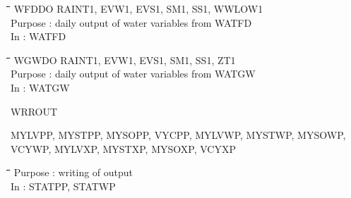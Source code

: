 \documentclass[11pt]{article}
\begin{document}
\begin{tabbing}
\hspace{1.27cm}\=\hspace{1.27cm}\=\hspace{1.27cm}\=\hspace{1.27cm}\=%
\hspace{1.27cm}\=\hspace{1.27cm}\=\hspace{1.27cm}\=\hspace{1.27cm}\=%
\hspace{1.27cm}\=\hspace{1.27cm}\=\kill
 WFDDO\> \> RAINT1, EVW1, EVS1, SM1, SS1, WWLOW1\\
\>\> Purpose\> : daily output of water variables from WATFD\\
\>\> In\> : WATFD
\end{tabbing}

\nwln
\begin{tabbing}
\hspace{1.27cm}\=\hspace{1.27cm}\=\hspace{1.27cm}\=\hspace{1.27cm}\=%
\hspace{1.27cm}\=\hspace{1.27cm}\=\hspace{1.27cm}\=\hspace{1.27cm}\=%
\hspace{1.27cm}\=\hspace{1.27cm}\=\kill
WGWDO\> \> RAINT1, EVW1, EVS1, SM1, SS1, ZT1\\
\>\> Purpose\> : daily output of water variables from WATGW\\
\>\> In\> : WATGW
\end{tabbing}

\bigskip
WRROUT
\testlastline

\begin{indenting}{2.54cm}
MYLVPP, MYSTPP, MYSOPP, VYCPP, MYLVWP, MYSTWP, MYSOWP, VCYWP, MYLVXP,
MYSTXP, MYSOXP, VCYXP
\end{indenting}
\begin{tabbing}
\hspace{1.27cm}\=\hspace{1.27cm}\=\hspace{1.27cm}\=\hspace{1.27cm}\=%
\hspace{1.27cm}\=\hspace{1.27cm}\=\hspace{1.27cm}\=\hspace{1.27cm}\=%
\hspace{1.27cm}\=\hspace{1.27cm}\=\kill
\>\> Purpose\> : writing of output\\
\>\> In\> : STATPP, STATWP
\end{tabbing}
\end{document}
